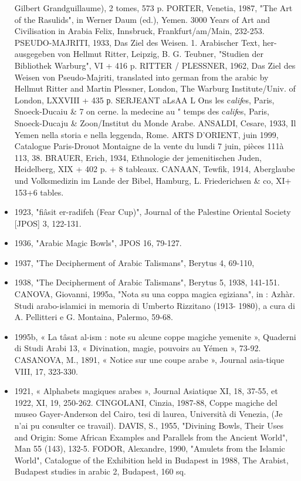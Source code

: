 \begin{itemize}
Gilbert Grandguillaume), 2 tomes, 573 p.
PORTER, Venetia, 1987, "The Art of the Rasulids", in Werner Daum (ed.), Yemen. 3000 Years of Art and Civilisation in Arabia Felix, Innsbruck, Frankfurt/am/Main, 232-253.
PSEUDO-MAJRITI, 1933, Das Ziel des Weisen. 1. Arabischer Text, her-
ausgegeben von Hellmut Ritter, Leipzig, B. G. Teubner, "Studien der
Bibliothek Warburg", VI + 416 p.
RITTER / PLESSNER, 1962, Das Ziel des Weisen von Pseudo-Majriti,
translated into german from the arabic by Hellmut Ritter and Martin
Plessner, London, The Warburg Institute/Univ. of London, LXXVIII
+ 435 р.
SERJEANT aLsAA L Ons les c\textit{alif}es, Paris, Snoeck-Ducaiu \& 7 on cerne. la medecine au
" temps des c\textit{alif}es, Paris, Snoeck-Ducaju \& Zoon/Institut du Monde Arabe.
ANSALDI, Cesare, 1933, Il Yemen nella storia e nella leggenda, Rome.
ARTS D'ORIENT, juin 1999, Catalogue Paris-Drouot Montaigne de la vente du lundi 7 juin, pièces 111à 113, 38.
BRAUER, Erich, 1934, Ethnologie der jemenitischen Juden, Heidelberg,
XIX + 402 p. + 8 tableaux.
CANAAN, Tewfik, 1914, Aberglaube und Volksmedizin im Lande der
Bibel, Hamburg, L. Friederichsen \& co, XI+ 153+6 tables.
\item 1923, "fiâsit er-radifeh (Fear Cup)", Journal of the Palestine Oriental Society [JPOS] 3, 122-131.
\item 1936, "Arabic Magic Bowls", JPOS 16, 79-127.
\item 1937, "The Decipherment of Arabic Talismans", Berytus 4, 69-110,
\item 1938, "The Decipherment of Arabic Talismans", Berytus 5, 1938,
141-151.
CANOVA, Giovanni, 1995a, "Nota su una coppa magica egiziana", in :
Azhàr. Studi arabo-islamici in memoria di Umberto Rizzitano (1913-
1980), a cura di A. Pellitteri e G. Montaina, Palermo, 59-68.
\item 1995b, « La tâsat al-ism : note su alcune coppe magiche yemenite », Quaderni di Studi Arabi 13, « Divination, magie, pouvoirs au
Yémen », 73-92.
CASANOVA, M., 1891, « Notice sur une coupe arabe », Journal asia-tique VIII, 17, 323-330.
\item 1921, « Alphabets magiques arabes », Journal Asiatique XI, 18,
37-55, et 1922, XI, 19, 250-262.
CINGOLANI, Cinzia, 1987-88, Coppe magiche del museo Gayer-Anderson del Cairo, tesi di laurea, Università di Venezia, (Je n'ai pu consulter ce travail).
DAVIS, S., 1955, "Divining Bowls, Their Uses and Origin: Some African Examples and Parallels from the Ancient World", Man 55
(143), 132-5.
FODOR, Alexandre, 1990, "Amulets from the Islamic World", Catalogue of the Exhibition held in Budapest in 1988, The Arabist, Budapest studies in arabic 2, Budapest, 160 sq.

\end{itemize}
